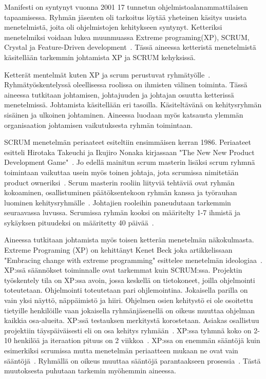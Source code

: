\documentclass[finnish]{tktltiki2}
\theoremstyle{definition}
\theoremstyle{remark}
\begin{document}
Manifesti on syntynyt vuonna 2001 17 tunnetun ohjelmistoalanammattilaisen tapaamisessa. Ryhmän jäsenten oli tarkoitus löytää yheteinen käsitys uusista menetelmistä, joita oli ohjelmistojen kehitykseen syntynyt. Ketteriksi menetelmiksi voidaan lukea muunmuassa Extreme programing(XP), SCRUM, Crystal  ja Feature-Driven development~\cite{fowler2001agile}. Tässä aineessa ketteristä menetelmistä käsitellään tarkemmin johtamista XP ja SCRUM kehyksissä.  

Ketterät mentelmät kuten XP ja scrum perustuvat ryhmätyölle~\cite{4755768}. Ryhmätyöskentelyssä oleellisessa roolissa on ihmisten välinen toiminta. Tässä aineessa tutkitaan johtamisen, johtajuuden ja johtajan osuutta ketterissä menetelmissä. Johtamista käsitellään eri tasoilla. Käsiteltävänä on kehitysryhmän sisäinen ja ulkoinen johtaminen. Aineessa luodaan myös katsausta ylemmän organisaation johtamisen vaikutuksesta ryhmän toimintaan.

SCRUM menetelmän periaateet esiteltiin ensimmäisen kerran 1986. Periaateet esitteli Hirotaka Takeuchi ja Ikujiro Nonaka kirjassaan "The New New Product Development Game"~\cite{nonaka1986new}. Jo edellä mainitun scrum masterin lisäksi scrum ryhmnä toimintaan vaikuttaa usein myös toinen johtaja, jota scrumissa nimitetään product owneriksi~\cite{4755768}. Scrum masterin rooliin liityviä tehtäviä ovat ryhmän kokoaminen, osallistuminen päätöksentekoon ryhmän kanssa ja työrauhan luominen kehitysryhmälle~\cite{4755768}. Johtajien rooleihin paneudutaan tarkemmin seuraavassa luvussa. Scrumissa ryhmän kooksi on määritelty 1-7 ihmistä ja sykäyksen pituudeksi on määritetty 40 päivää~\cite{cohen2004introduction}.  

Aineessa tutkitaan johtamista myös toisen ketterän menetelmän näkokulmasta. Extreme Programing (XP) on kehittänyt Kenet Beck joka artikkelissaan "Embracing change with extreme programming" esittelee menetelmän ideologiaa~\cite{796139}. XP:ssä säännökset toiminnalle ovat tarkemmat kuin SCRUM:ssa. Projektin työskentely tila on XP:ssa avoin, jossa keskellä on tietokoneet, joilla ohjelmointi toteutetaan. Ohjelmointi toteutetaan pari ohjlemointina. Jokaisella parilla on vain yksi näyttö, näppäimistö ja hiiri. Ohjelmen osien kehitystö ei ole osoitettu tietyille henkilöille vaan jokaisella ryhmänjäsenellä on oikeus muuttaa ohjelman kaikkia osa-alueita. XP:ssä testauksen merkitystä korostetaan. Asiakas osallistuu projektiin täyspäiväisesti eli on osa kehitys ryhmään~\cite{796139}. XP:ssa tyhmnä koko on 2-10 henkilöä ja iteraation pituus on 2 viikkoa~\cite{cohen2004introduction}. XP:ssa on enemmän sääntöjä kuin esimerkiksi scrumissa mutta menetelmän periaatteen mukaan ne ovat vain sääntöjä~\cite{cohen2004introduction}. Ryhmällä on oikeus muuttaa sääntöjä parantaakseen prosessia~\cite{cohen2004introduction}. Tästä muutoksesta puhutaan tarkemin myöhemmin aineessa.   
\end{document}
